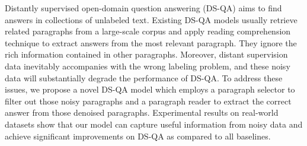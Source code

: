 Distantly supervised open-domain question answering (DS-QA) aims to find answers in collections of unlabeled text. Existing DS-QA models usually retrieve related paragraphs from a large-scale corpus and apply reading comprehension technique to extract answers from the most relevant paragraph. They ignore the rich information contained in other paragraphs. Moreover, distant supervision data inevitably accompanies with the wrong labeling problem, and these noisy data will substantially degrade the performance of DS-QA. To address these issues, we propose a novel DS-QA model which employs a paragraph selector to filter out those noisy paragraphs and a paragraph reader to extract the correct answer from those denoised paragraphs. Experimental results on real-world datasets show that our model can capture useful information from noisy data and achieve significant improvements on DS-QA as compared to all baselines.
